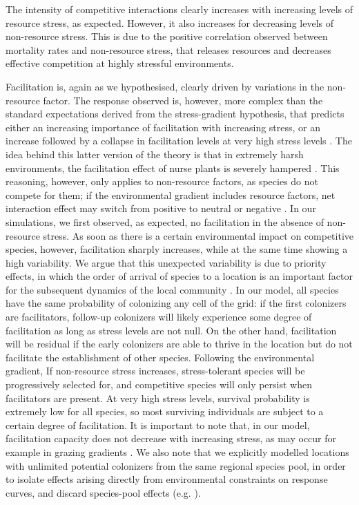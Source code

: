 The intensity of competitive interactions clearly increases with increasing levels of resource stress, as expected. However, it also increases for decreasing levels of non-resource stress. This is due to the positive correlation observed between mortality rates and non-resource stress, that releases resources and decreases effective competition at highly stressful environments.

Facilitation is, again as we hypothesised, clearly driven by variations in the non-resource factor. The response observed is, however, more complex than the standard expectations derived from the stress-gradient hypothesis, that predicts either an increasing importance of facilitation with increasing stress, or an increase followed by a collapse in facilitation levels at very high stress levels \citep{leRoux2010}. The idea behind this latter version of the theory is that in extremely harsh environments, the facilitation effect of nurse plants is severely hampered \citep{Michalet2006}. This reasoning, however, only applies to non-resource factors, as species do not compete for them; if the environmental gradient includes resource factors, net interaction effect may switch from positive to neutral or negative \citep{Smit2007,Michalet2014}. In our simulations, we first observed, as expected, no facilitation in the absence of non-resource stress. As soon as there is a certain environmental impact on competitive species, however, facilitation sharply increases, while at the same time showing a high variability. We argue that this unexpected variability is due to priority effects, in which the order of arrival of species to a location is an important factor for the subsequent dynamics of the local community \citep{Fukami2015}. In our model, all species have the same probability of colonizing any cell of the grid: if the first colonizers are facilitators, follow-up colonizers will likely experience some degree of facilitation as long as stress levels are not null. On the other hand, facilitation will be residual if the early colonizers are able to thrive in the location but do not facilitate the establishment of other species. Following the environmental gradient, If non-resource stress increases, stress-tolerant species will be progressively selected for, and competitive species will only persist when facilitators are present. At very high stress levels, survival probability is extremely low for all species, so most surviving individuals are subject to a certain degree of facilitation. It is important to note that, in our model, facilitation capacity does not decrease with increasing stress, as may occur for example in grazing gradients \citep{Smit2007}. We also note that we explicitly modelled locations with unlimited potential colonizers from the same regional species pool, in order to isolate effects arising directly from environmental constraints on response curves, and discard species-pool effects (e.g. \citealt{Partel1996}).

